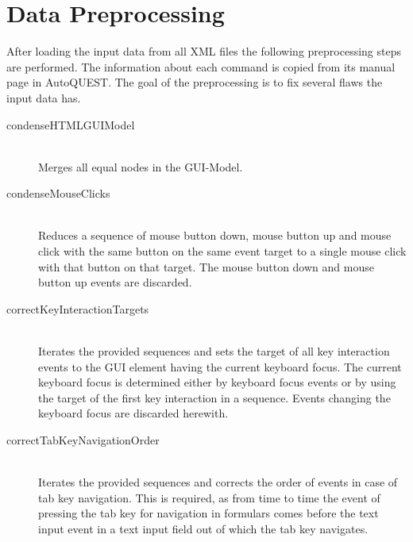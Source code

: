 \section{Data Preprocessing}
After loading the input data from all XML files the following preprocessing steps are performed. The information about each command is copied from its manual page in AutoQUEST. 
The goal of the preprocessing is to fix several flaws the input data has.
\begin{description}
	\item[condenseHTMLGUIModel]\hfill\\ Merges all equal nodes in the GUI-Model.
	\item[condenseMouseClicks]\hfill\\ Reduces a sequence of mouse button down, mouse button up and mouse click with the same button on the same event target to a single mouse click with that button on that target. The mouse button down and mouse button up events are discarded.
	\item[correctKeyInteractionTargets]\hfill\\ Iterates the provided sequences and sets the target of all key interaction events to the GUI element having the current keyboard focus. The current keyboard focus is determined either by keyboard focus events or by using the target of the first key interaction in a sequence. Events changing the keyboard focus are discarded herewith.
	\item[correctTabKeyNavigationOrder]\hfill\\ Iterates the provided sequences and corrects the order of events in case of tab key navigation. This is required, as from time to time the event of pressing the tab key for navigation in formulars comes before the text input event in a text input field out of which the tab key navigates.
\end{description}

